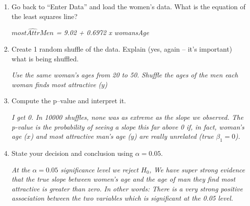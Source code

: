 \begin{enumerate}
\begin{enumerate}
  \item Go back to ``Enter Data'' and load the women's data.  What is
    the equation of the least squares line?
\begin{students}
 \vspace{1cm}      
\end{students}

\begin{key}
  {\it $\widehat{mostAttrMen}$ = 9.02 + 0.6972 x womansAge}
\end{key}


  \item Create 1 random shuffle of the data.  Explain (yes, again --
    it's important)  what is being shuffled. 
\begin{students}
 \vspace{1.8cm}      
\end{students}

\begin{key}
  {\it Use the same woman's ages from 20 to 50. Shuffle the ages of the
    men each woman finds most attractive ($y$)}
\end{key}

  \item Compute the p--value and interpret it.
\begin{students}
 \vspace{1cm}      
\end{students}

\begin{key}
  {\it I get 0. In 10000 shuffles, none was as extreme as the slope we
    observed. The p-value is the probability of seeing a slope this
    far above 0 if, in fact, woman's age ($x$) and most attractive
    man's age ($y$) are really unrelated (true $\beta_1=0$).}
\end{key}


\item State your decision and conclusion using $\alpha = 0.05$.
\begin{students}
 \vspace{2cm}      
\end{students}

\begin{key}
  {\it At the $\alpha = 0.05$ significance level we  reject
    $H_0$, We have super strong evidence that the true slope between
    women's age and the age of man they find most attractive is
    greater than zero.  In other words: There is a very strong positive
    association between the two variables which is significant at
    the 0.05 level.}
\end{key}


\end{enumerate}
\end{enumerate}

